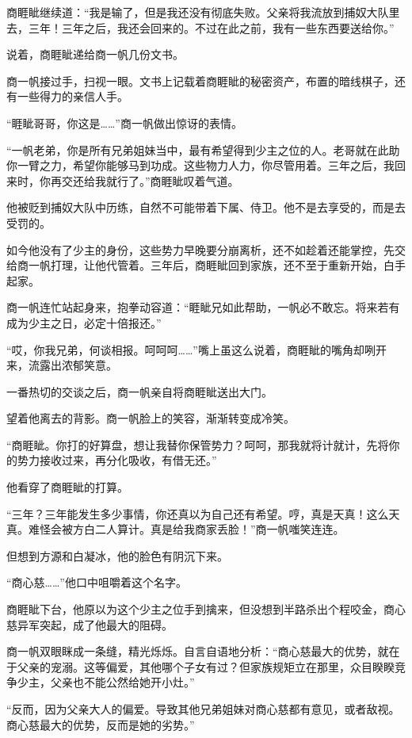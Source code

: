 
\begin{this_body}

商睚眦继续道：“我是输了，但是我还没有彻底失败。父亲将我流放到捕奴大队里去，三年！三年之后，我还会回来的。不过在此之前，我有一些东西要送给你。”

说着，商睚眦递给商一帆几份文书。

商一帆接过手，扫视一眼。文书上记载着商睚眦的秘密资产，布置的暗线棋子，还有一些得力的亲信人手。

“睚眦哥哥，你这是……”商一帆做出惊讶的表情。

“一帆老弟，你是所有兄弟姐妹当中，最有希望得到少主之位的人。老哥就在此助你一臂之力，希望你能够马到功成。这些物力人力，你尽管用着。三年之后，我回来时，你再交还给我就行了。”商睚眦叹着气道。

他被贬到捕奴大队中历练，自然不可能带着下属、侍卫。他不是去享受的，而是去受罚的。

如今他没有了少主的身份，这些势力早晚要分崩离析，还不如趁着还能掌控，先交给商一帆打理，让他代管着。三年后，商睚眦回到家族，还不至于重新开始，白手起家。

商一帆连忙站起身来，抱拳动容道：“睚眦兄如此帮助，一帆必不敢忘。将来若有成为少主之日，必定十倍报还。”

“哎，你我兄弟，何谈相报。呵呵呵……”嘴上虽这么说着，商睚眦的嘴角却咧开来，流露出浓郁笑意。

一番热切的交谈之后，商一帆亲自将商睚眦送出大门。

望着他离去的背影。商一帆脸上的笑容，渐渐转变成冷笑。

“商睚眦。你打的好算盘，想让我替你保管势力？呵呵，那我就将计就计，先将你的势力接收过来，再分化吸收，有借无还。”

他看穿了商睚眦的打算。

“三年？三年能发生多少事情，你还真以为自己还有希望。哼，真是天真！这么天真。难怪会被方白二人算计。真是给我商家丢脸！”商一帆嗤笑连连。

但想到方源和白凝冰，他的脸色有阴沉下来。

“商心慈……”他口中咀嚼着这个名字。

商睚眦下台，他原以为这个少主之位手到擒来，但没想到半路杀出个程咬金，商心慈异军突起，成了他最大的阻碍。

商一帆双眼眯成一条缝，精光烁烁。自言自语地分析：“商心慈最大的优势，就在于父亲的宠溺。这等偏爱，其他哪个子女有过？但家族规矩立在那里，众目睽睽竞争少主，父亲也不能公然给她开小灶。”

“反而，因为父亲大人的偏爱。导致其他兄弟姐妹对商心慈都有意见，或者敌视。商心慈最大的优势，反而是她的劣势。”


\end{this_body}
